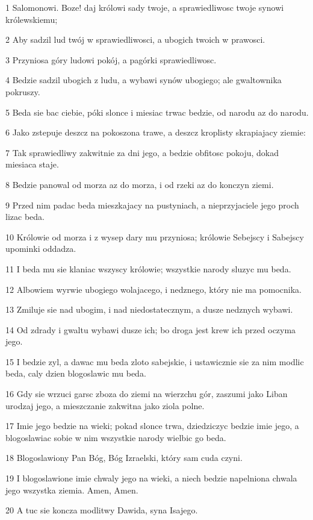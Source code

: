 \par 1 Salomonowi. Boze! daj królowi sady twoje, a sprawiedliwosc twoje synowi królewskiemu;
\par 2 Aby sadzil lud twój w sprawiedliwosci, a ubogich twoich w prawosci.
\par 3 Przyniosa góry ludowi pokój, a pagórki sprawiedliwosc.
\par 4 Bedzie sadzil ubogich z ludu, a wybawi synów ubogiego; ale gwaltownika pokruszy.
\par 5 Beda sie bac ciebie, póki slonce i miesiac trwac bedzie, od narodu az do narodu.
\par 6 Jako zstepuje deszcz na pokoszona trawe, a deszcz kroplisty skrapiajacy ziemie:
\par 7 Tak sprawiedliwy zakwitnie za dni jego, a bedzie obfitosc pokoju, dokad miesiaca staje.
\par 8 Bedzie panowal od morza az do morza, i od rzeki az do konczyn ziemi.
\par 9 Przed nim padac beda mieszkajacy na pustyniach, a nieprzyjaciele jego proch lizac beda.
\par 10 Królowie od morza i z wysep dary mu przyniosa; królowie Sebejscy i Sabejscy upominki oddadza.
\par 11 I beda mu sie klaniac wszyscy królowie; wszystkie narody sluzyc mu beda.
\par 12 Albowiem wyrwie ubogiego wolajacego, i nedznego, który nie ma pomocnika.
\par 13 Zmiluje sie nad ubogim, i nad niedostatecznym, a dusze nedznych wybawi.
\par 14 Od zdrady i gwaltu wybawi dusze ich; bo droga jest krew ich przed oczyma jego.
\par 15 I bedzie zyl, a dawac mu beda zloto sabejskie, i ustawicznie sie za nim modlic beda, caly dzien blogoslawic mu beda.
\par 16 Gdy sie wrzuci garsc zboza do ziemi na wierzchu gór, zaszumi jako Liban urodzaj jego, a mieszczanie zakwitna jako ziola polne.
\par 17 Imie jego bedzie na wieki; pokad slonce trwa, dziedziczyc bedzie imie jego, a blogoslawiac sobie w nim wszystkie narody wielbic go beda.
\par 18 Blogoslawiony Pan Bóg, Bóg Izraelski, który sam cuda czyni.
\par 19 I blogoslawione imie chwaly jego na wieki, a niech bedzie napelniona chwala jego wszystka ziemia. Amen, Amen.
\par 20 A tuc sie koncza modlitwy Dawida, syna Isajego.

